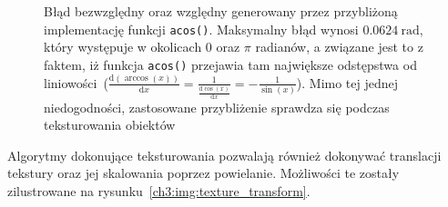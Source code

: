 \begin{enumerate}
\begin{itemize}
\begin{figure}[H]
\centering
{}
\caption[Błąd bezwzględny oraz względny generowany przez przybliżoną implementację funkcji \texttt{acos()}]{Błąd bezwzględny oraz względny generowany przez przybliżoną implementację funkcji \texttt{acos()}. Maksymalny błąd wynosi $0.0624\ \mathrm{rad}$, który występuje w okolicach 0 oraz $\pi$ radianów, a związane jest to z faktem, iż funkcja \texttt{acos()} przejawia tam największe odstępstwa od liniowości~($\frac{\mathrm{d}(\arccos(x))}{\mathrm{d}x} = \frac{1}{\frac{\mathrm{d}\cos(x)}{\mathrm{d}x}} = -\frac{1}{\sin(x)}$). Mimo tej jednej niedogodności, zastosowane przybliżenie sprawdza się podczas teksturowania obiektów}
\label{ch3:img:acos_error}
\end{figure}

\end{itemize}

Algorytmy dokonujące teksturowania pozwalają również dokonywać translacji tekstury oraz jej skalowania poprzez powielanie. Możliwości te zostały zilustrowane na rysunku~\ref{ch3:img:texture_transform}.


\end{enumerate}

